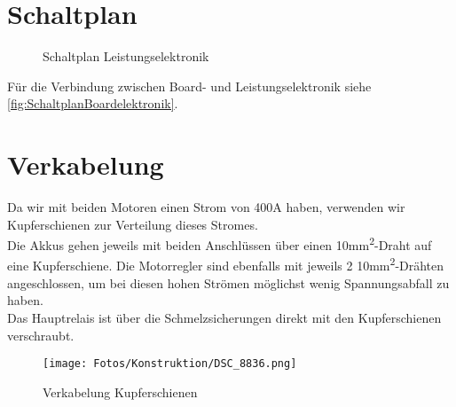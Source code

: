 \section{Schaltplan}
\begin{figure}[H]
    
    \caption{Schaltplan Leistungselektronik\label{fig:schaltLeistung}}
\end{figure}
Für die Verbindung zwischen Board- und Leistungselektronik siehe \autoref{fig:SchaltplanBoardelektronik}.

\clearpage
\section{Verkabelung}
Da wir mit beiden Motoren einen Strom von 400A haben, verwenden wir Kupferschienen zur Verteilung dieses Stromes.\\
Die Akkus gehen jeweils mit beiden Anschlüssen über einen 10mm\textsuperscript{2}-Draht auf eine Kupferschiene. Die Motorregler sind ebenfalls mit jeweils 2 10mm\textsuperscript{2}-Drähten angeschlossen, um bei diesen hohen Strömen möglichst wenig Spannungsabfall zu haben.\\
Das Hauptrelais ist über die Schmelzsicherungen direkt mit den Kupferschienen verschraubt.
\begin{figure}[H]
    \texttt{[image: Fotos/Konstruktion/DSC\_8836.png]}
    \caption{Verkabelung Kupferschienen}
\end{figure}


\clearpage